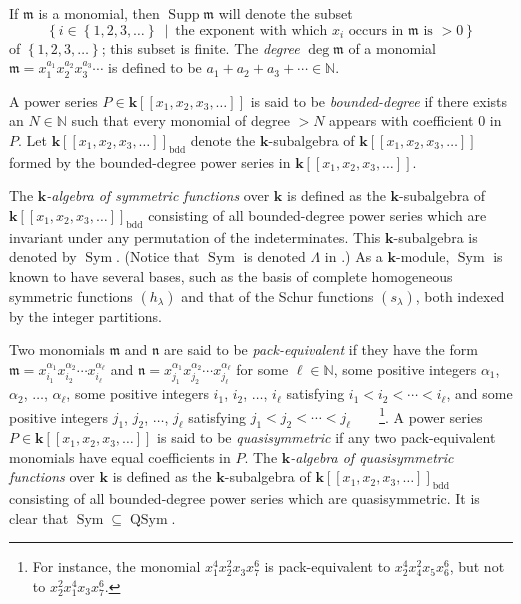 \documentclass
[numbers=enddot,12pt,final,onecolumn,notitlepage,abstracton]{scrartcl}%
\theoremstyle{definition}
\begin{document}
If $\mathfrak{m}$ is a monomial, then $\operatorname*{Supp}\mathfrak{m}$ will
denote the subset
\[
\left\{  i\in\left\{  1,2,3,\ldots\right\}  \ \mid\ \text{the exponent with
which }x_{i}\text{ occurs in }\mathfrak{m}\text{ is }>0\right\}
\]
of $\left\{  1,2,3,\ldots\right\}  $; this subset is finite. The
\textit{degree} $\deg\mathfrak{m}$ of a monomial $\mathfrak{m}=x_{1}^{a_{1}%
}x_{2}^{a_{2}}x_{3}^{a_{3}}\cdots$ is defined to be $a_{1}+a_{2}+a_{3}%
+\cdots\in\mathbb{N}$.

A power series $P\in\mathbf{k}\left[  \left[  x_{1},x_{2},x_{3},\ldots\right]
\right]  $ is said to be \textit{bounded-degree} if there exists an
$N\in\mathbb{N}$ such that every monomial of degree $>N$ appears with
coefficient $0$ in $P$. Let $\mathbf{k}\left[  \left[  x_{1},x_{2}%
,x_{3},\ldots\right]  \right]  _{\operatorname*{bdd}}$ denote the $\mathbf{k}%
$-subalgebra of $\mathbf{k}\left[  \left[  x_{1},x_{2},x_{3},\ldots\right]
\right]  $ formed by the bounded-degree power series in $\mathbf{k}\left[
\left[  x_{1},x_{2},x_{3},\ldots\right]  \right]  $.

The $\mathbf{k}$\textit{-algebra of symmetric functions} over $\mathbf{k}$ is
defined as the $\mathbf{k}$-subalgebra of $\mathbf{k}\left[  \left[
x_{1},x_{2},x_{3},\ldots\right]  \right]  _{\operatorname*{bdd}}$ consisting
of all bounded-degree power series which are invariant under any permutation
of the indeterminates. This $\mathbf{k}$-subalgebra is denoted by
$\operatorname*{Sym}$. (Notice that $\operatorname*{Sym}$ is denoted $\Lambda$
in \cite{Reiner}.) As a $\mathbf{k}$-module, $\operatorname*{Sym}$ is known to
have several bases, such as the basis of complete homogeneous symmetric
functions $\left(  h_{\lambda}\right)  $ and that of the Schur functions
$\left(  s_{\lambda}\right)  $, both indexed by the integer partitions.

Two monomials $\mathfrak{m}$ and $\mathfrak{n}$ are said to be
\textit{pack-equivalent} if they have the form $\mathfrak{m}=x_{i_{1}}%
^{\alpha_{1}}x_{i_{2}}^{\alpha_{2}}\cdots x_{i_{\ell}}^{\alpha_{\ell}}$ and
$\mathfrak{n}=x_{j_{1}}^{\alpha_{1}}x_{j_{2}}^{\alpha_{2}}\cdots x_{j_{\ell}%
}^{\alpha_{\ell}}$ for some $\ell\in\mathbb{N}$, some positive integers
$\alpha_{1}$, $\alpha_{2}$, $\ldots$, $\alpha_{\ell}$, some positive integers
$i_{1}$, $i_{2}$, $\ldots$, $i_{\ell}$ satisfying $i_{1}<i_{2}<\cdots<i_{\ell
}$, and some positive integers $j_{1}$, $j_{2}$, $\ldots$, $j_{\ell}$
satisfying $j_{1}<j_{2}<\cdots<j_{\ell}$\ \ \ \ \footnote{For instance, the
monomial $x_{1}^{4} x_{2}^{2} x_{3} x_{7}^{6}$ is pack-equivalent to
$x_{2}^{4} x_{4}^{2} x_{5} x_{6}^{6}$, but not to $x_{2}^{2} x_{1}^{4} x_{3}
x_{7}^{6}$.}. A power series $P\in\mathbf{k}\left[  \left[  x_{1},x_{2}%
,x_{3},\ldots\right]  \right]  $ is said to be \textit{quasisymmetric} if any
two pack-equivalent monomials have equal coefficients in $P$. The $\mathbf{k}%
$\textit{-algebra of quasisymmetric functions} over $\mathbf{k}$ is defined as
the $\mathbf{k}$-subalgebra of $\mathbf{k}\left[  \left[  x_{1},x_{2}%
,x_{3},\ldots\right]  \right]  _{\operatorname*{bdd}}$ consisting of all
bounded-degree power series which are quasisymmetric. It is clear that
$\operatorname*{Sym}\subseteq\operatorname*{QSym}$.
\end{document}
